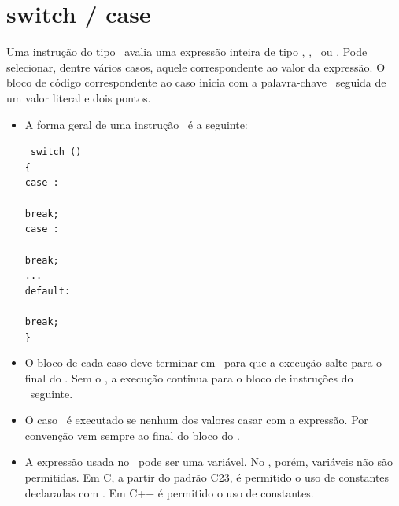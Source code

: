 \section{switch / case}

Uma instrução do tipo \SWITCH\ avalia uma expressão inteira de tipo \INT, \CHAR, \SHORT\ ou \LONG. Pode selecionar, dentre vários casos, aquele correspondente ao valor da expressão. O bloco de código correspondente ao caso inicia com a palavra-chave \CASE\ seguida de um valor literal e dois pontos.

\begin{itemize}

\item A forma geral de uma instrução \SWITCH\ é a seguinte:

{\tt 
switch ()             \\
\{ \\
\TAB case : \\
\TAB\TAB {} \\
\TAB\TAB break; \\
\TAB case : \\
\TAB\TAB {} \\
\TAB\TAB break; \\
\TAB ... \\
\TAB default: \\
\TAB\TAB {} \\
\TAB\TAB break; \\
\} \\
}

\item O bloco de cada caso deve terminar em \BREAK\ para que a execução salte para o final do \SWITCH. Sem o \BREAK, a execução continua para o bloco de instruções do \CASE\ seguinte.

\item O caso \DEFAULT\ é executado se nenhum dos valores casar com a expressão. Por convenção vem sempre ao final do bloco do \SWITCH.

\item A expressão usada no \SWITCH\ pode ser uma variável. No \CASE, porém, variáveis não são permitidas. Em C, a partir do padrão C23, é permitido o uso de constantes declaradas com \CONSTEXPR. Em C++ é permitido o uso de constantes.

\end{itemize}


